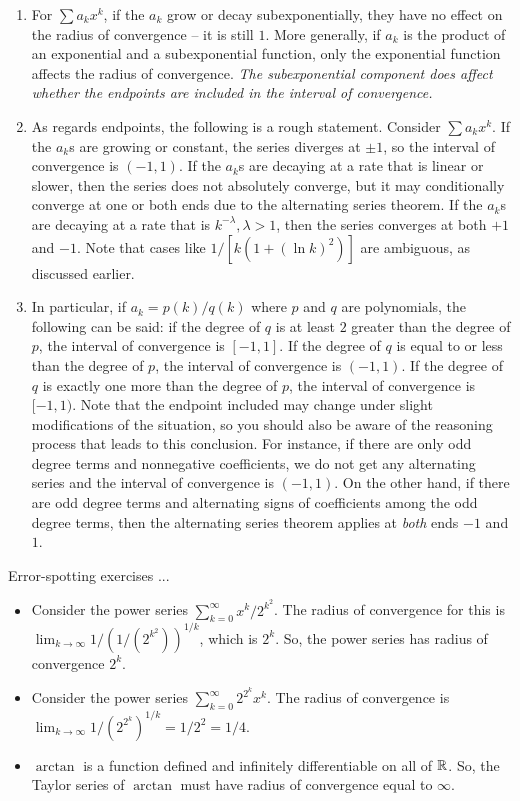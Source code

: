 \documentclass[10pt]{amsart}
\begin{document}
\begin{enumerate}
\item For $\sum a_kx^k$, if the $a_k$ grow or decay subexponentially,
  they have no effect on the radius of convergence -- it is still
  $1$. More generally, if $a_k$ is the product of an exponential and a
  subexponential function, only the exponential function affects the
  radius of convergence. {\em The subexponential component does affect
  whether the endpoints are included in the interval of convergence.}
\item As regards endpoints, the following is a rough
  statement. Consider $\sum a_kx^k$. If the $a_k$s are growing or
  constant, the series diverges at $\pm 1$, so the interval of
  convergence is $(-1,1)$. If the $a_k$s are decaying at a rate that
  is linear or slower, then the series does not absolutely converge,
  but it may conditionally converge at one or both ends due to the
  alternating series theorem. If the $a_k$s are decaying at a rate
  that is $k^{-\lambda}, \lambda > 1$, then the series converges at
  both $+1$ and $-1$. Note that cases like $1/[k(1 + (\ln k)^2)]$ are
  ambiguous, as discussed earlier.
\item In particular, if $a_k = p(k)/q(k)$ where $p$ and $q$ are
  polynomials, the following can be said: if the degree of $q$ is at
  least $2$ greater than the degree of $p$, the interval of
  convergence is $[-1,1]$. If the degree of $q$ is equal to or less
  than the degree of $p$, the interval of convergence is $(-1,1)$. If
  the degree of $q$ is exactly one more than the degree of $p$, the
  interval of convergence is $[-1,1)$. Note that the endpoint included
  may change under slight modifications of the situation, so you
  should also be aware of the reasoning process that leads to this
  conclusion. For instance, if there are only odd degree terms and
  nonnegative coefficients, we do not get any alternating series and
  the interval of convergence is $(-1,1)$. On the other hand, if there
  are odd degree terms and alternating signs of coefficients among the
  odd degree terms, then the alternating series theorem applies at
  {\em both} ends $-1$ and $1$.
\end{enumerate}

Error-spotting exercises ...

\begin{itemize}
\item Consider the power series $\sum_{k=0}^\infty x^k/2^{k^2}$. The
  radius of convergence for this is $\lim_{k \to \infty}
  1/(1/(2^{k^2}))^{1/k}$, which is $2^k$. So, the power series has radius of
  convergence $2^k$.
\item Consider the power series $\sum_{k=0}^\infty 2^{2^k}x^k$. The
  radius of convergence is $\lim_{k \to \infty} 1/(2^{2^k})^{1/k} =
  1/2^2 = 1/4$.
\item $\arctan$ is a function defined and infinitely differentiable on
  all of $\mathbb{R}$. So, the Taylor series of $\arctan$ must have radius of
  convergence equal to $\infty$.
\end{itemize}
\end{document}
